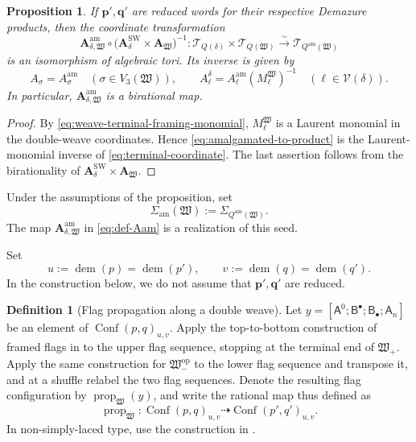 \documentclass[10pt,a4paper]{article}
\newtheorem{proposition}[theorem]{Proposition}
\theoremstyle{definition}
\newtheorem{definition}[theorem]{Definition}
\theoremstyle{remark}
\newcommand{\flagA}{\mathsf{A}}
\newcommand{\flagB}{\mathsf{B}}
\newcommand{\Conf}{\operatorname{Conf}}
\newcommand{\Tcal}{\mathcal T}
\newcommand{\Vcal}{\mathcal V}
\newcommand{\fW}{\mathfrak W}
\begin{document}
\begin{proposition}
If \(\mathbf p',\mathbf q'\) are reduced words for their respective Demazure
products, then the coordinate transformation
\[
 \mathbf A_{\delta,\fW}^{\mathrm{am}}
 \circ
 \bigl(\mathbf A_\delta^{\mathrm{SW}}\times\mathbf A_\fW\bigr)^{-1}:
 \Tcal_{Q(\delta)}\times\Tcal_{Q(\fW)}
 \xrightarrow{\sim}\Tcal_{Q^{\mathrm{am}}(\fW)}
\]
is an isomorphism of algebraic tori.  Its inverse is given by
\begin{equation}
 A_\sigma=A_\sigma^{\mathrm{am}}
 \quad(\sigma\in V_3(\fW)),\qquad
 A_\ell^\delta
 =
 A_\ell^{\mathrm{am}}(M_\ell^\fW)^{-1}
 \quad(\ell\in\Vcal(\delta)).
 \label{eq:amalgamated-to-product}
\end{equation}
In particular, \(\mathbf A_{\delta,\fW}^{\mathrm{am}}\) is a birational map.
\end{proposition}

\begin{proof}
By \eqref{eq:weave-terminal-framing-monomial}, \(M_\ell^\fW\) is a
Laurent monomial in the double-weave coordinates.  Hence
\eqref{eq:amalgamated-to-product} is the Laurent-monomial inverse of
\eqref{eq:terminal-coordinate}.  The last assertion follows from the
birationality of
\(\mathbf A_\delta^{\mathrm{SW}}\times\mathbf A_\fW\).
\end{proof}

Under the assumptions of the proposition, set
\[
 \Sigma_{\mathrm{am}}(\fW):=\Sigma_{Q^{\mathrm{am}}(\fW)}.
\]
The map \(\mathbf A_{\delta,\fW}^{\mathrm{am}}\) in
\eqref{eq:def-Aam} is a realization of this seed.

Set
\[
 u:=\operatorname{dem}(p)
   =\operatorname{dem}(p'),
 \qquad
 v:=\operatorname{dem}(q)
   =\operatorname{dem}(q').
\]
In the construction below, we do not assume that \(\mathbf p',\mathbf q'\) are
reduced.

\begin{definition}[Flag propagation along a double weave]
\label{def:component-terminal-propagation}
Let \(y=[\flagA^0;\flagB^\bullet;\flagB_\bullet;\flagA_n]\) be an element of
\(\Conf(p,q)_{u,v}\).  Apply the top-to-bottom construction of framed flags in
\cite[Section~5]{CasalsEtAlBraidVarieties} to the upper flag sequence, stopping at
the terminal end of \(\fW_+\).  Apply the same construction for
\(\fW_-^{\mathrm{op}}\) to the lower flag sequence and transpose it, and at a
shuffle relabel the two flag sequences.  Denote the resulting flag
configuration by \(\operatorname{prop}_{\fW}(y)\), and write the rational map
thus defined as
\[
 \operatorname{prop}_{\fW}:
 \Conf(p,q)_{u,v}
 \dashrightarrow
 \Conf(p',q')_{u,v}.
\]
In non-simply-laced type, use the construction in
\cite[Section~6.1]{CasalsEtAlBraidVarieties}.
\end{definition}
\end{document}
